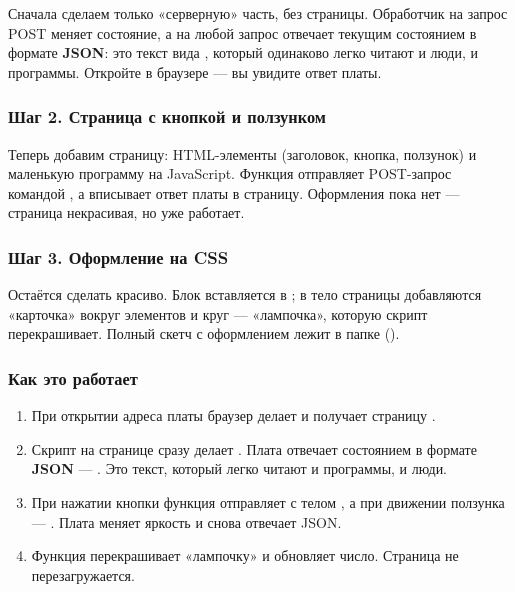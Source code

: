 Сначала сделаем только «серверную» часть, без страницы. Обработчик  на запрос POST меняет
состояние, а на любой запрос отвечает текущим состоянием в формате \textbf{JSON}: это текст вида
, который одинаково легко читают и люди, и программы. Откройте
 в браузере --- вы увидите ответ платы.


\subsubsection{Шаг 2. Страница с кнопкой и ползунком}

Теперь добавим страницу: HTML-элементы (заголовок, кнопка, ползунок) и маленькую программу на JavaScript.
Функция  отправляет POST-запрос командой , а  вписывает ответ
платы в страницу. Оформления пока нет --- страница некрасивая, но уже работает.


\subsubsection{Шаг 3. Оформление на CSS}

Остаётся сделать красиво. Блок  вставляется в ; в тело страницы добавляются
«карточка»  вокруг элементов и круг  --- «лампочка»,
которую скрипт перекрашивает. Полный скетч с оформлением лежит в папке  ().


\subsubsection{Как это работает}

\begin{enumerate}
  \item При открытии адреса платы браузер делает  и получает страницу .
  \item Скрипт на странице сразу делает . Плата отвечает состоянием в формате
        \textbf{JSON} --- . Это текст, который легко читают и программы, и люди.
  \item При нажатии кнопки функция  отправляет  с телом ,
        а при движении ползунка --- . Плата меняет яркость и снова отвечает JSON.
  \item Функция  перекрашивает «лампочку» и обновляет число. Страница не перезагружается.
\end{enumerate}

